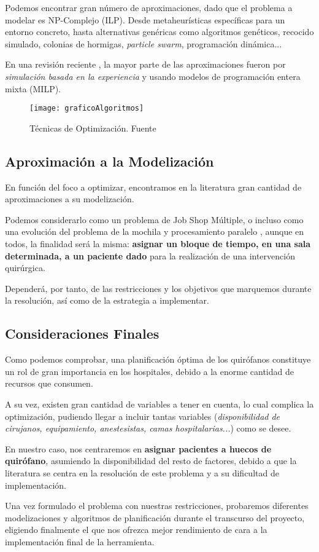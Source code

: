 Podemos encontrar gran número de aproximaciones, dado que el problema a modelar es NP-Complejo (ILP). Desde metaheurísticas específicas para un entorno concreto, hasta alternativas genéricas como algoritmos genéticos, recocido simulado, colonias de hormigas, \textit{particle swarm}, programación dinámica... 

En una revisión reciente \cite{Gur2018ApplicationOverview}, la mayor parte de las aproximaciones fueron por \textit{simulación basada en la experiencia} y usando modelos de programación entera mixta (MILP).


\begin{figure}
    \centering
    \texttt{[image: graficoAlgoritmos]}
    \caption{Técnicas de Optimización. Fuente \cite{Gur2018ApplicationOverview}}
    \label{GraficoTecnicasOpt}
\end{figure}

\subsection{Aproximación a la Modelización}

En función del foco a optimizar, encontramos en la literatura gran cantidad de aproximaciones a su modelización.

Podemos considerarlo como un problema de Job Shop Múltiple, o incluso como una evolución del problema de la mochila y procesamiento paralelo \cite{Lin2020AScheduling}, aunque en todos, la finalidad será la misma: \textbf{asignar un bloque de tiempo, en una sala determinada, a un paciente dado} para la realización de una intervención quirúrgica.

Dependerá, por tanto, de las restricciones y los objetivos que marquemos durante la resolución, así como de la estrategia a implementar.

\subsection{Consideraciones Finales}

Como podemos comprobar, una planificación óptima de los quirófanos constituye un rol de gran importancia en los hospitales, debido a la enorme cantidad de recursos que consumen. 

A su vez, existen gran cantidad de variables a tener en cuenta, lo cual complica \cite{Lin2020AScheduling} la optimización, pudiendo llegar a incluir tantas variables (\textit{disponibilidad de cirujanos, equipamiento, anestesistas, camas hospitalarias...}) como se desee.

En nuestro caso, nos centraremos en \textbf{asignar pacientes a huecos de quirófano}, asumiendo la disponibilidad del resto de factores, debido a que la literatura se centra en la resolución de este problema y a su dificultad de implementación.

Una vez formulado el problema con nuestras restricciones, probaremos diferentes modelizaciones y algoritmos de planificación durante el transcurso del proyecto, eligiendo finalmente el que nos ofrezca mejor rendimiento de cara a la implementación final de la herramienta.